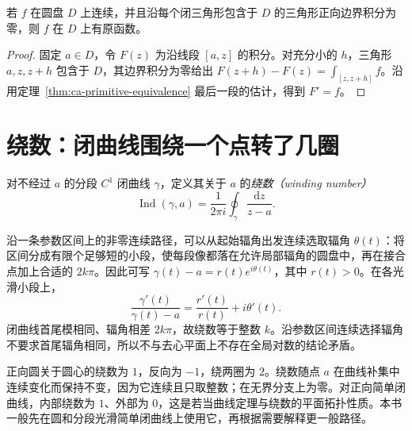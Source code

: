\begin{lemma}[圆盘上的三角形判别]
\label{lem:ca-triangle-primitive}
若 $f$ 在圆盘 $D$ 上连续，并且沿每个闭三角形包含于 $D$ 的三角形正向边界积分为零，则 $f$ 在 $D$ 上有原函数。
\end{lemma}
\begin{proof}
固定 $a\in D$，令 $F(z)$ 为沿线段 $[a,z]$ 的积分。对充分小的 $h$，三角形 $a,z,z+h$ 包含于 $D$，其边界积分为零给出 $F(z+h)-F(z)=\int_{[z,z+h]}f$。沿用定理~\ref{thm:ca-primitive-equivalence} 最后一段的估计，得到 $F'=f$。
\end{proof}

\section{绕数：闭曲线围绕一个点转了几圈}

\begin{definition}[绕数]
对不经过 $a$ 的分段 $C^1$ 闭曲线 $\gamma$，定义其关于 $a$ 的\emph{绕数（winding number）}
\begin{equation}
 \operatorname{Ind}(\gamma,a)=\frac1{2\pi i}\oint_\gamma\frac{\mathrm dz}{z-a}.
 \label{eq:ca-index}
\end{equation}
\end{definition}

沿一条参数区间上的非零连续路径，可以从起始辐角出发连续选取辐角 $\theta(t)$：将区间分成有限个足够短的小段，使每段像都落在允许局部辐角的圆盘中，再在接合点加上合适的 $2k\pi$。因此可写 $\gamma(t)-a=r(t)e^{i\theta(t)}$，其中 $r(t)>0$。在各光滑小段上，
\[
 \frac{\gamma'(t)}{\gamma(t)-a}=\frac{r'(t)}{r(t)}+i\theta'(t).
\]
闭曲线首尾模相同、辐角相差 $2k\pi$，故绕数等于整数 $k$。沿参数区间连续选择辐角不要求首尾辐角相同，所以不与去心平面上不存在全局对数的结论矛盾。

正向圆关于圆心的绕数为 $1$，反向为 $-1$，绕两圈为 $2$。绕数随点 $a$ 在曲线补集中连续变化而保持不变，因为它连续且只取整数；在无界分支上为零。对正向简单闭曲线，内部绕数为 $1$、外部为 $0$，这是若当曲线定理与绕数的平面拓扑性质。本书一般先在圆和分段光滑简单闭曲线上使用它，再根据需要解释更一般路径。

